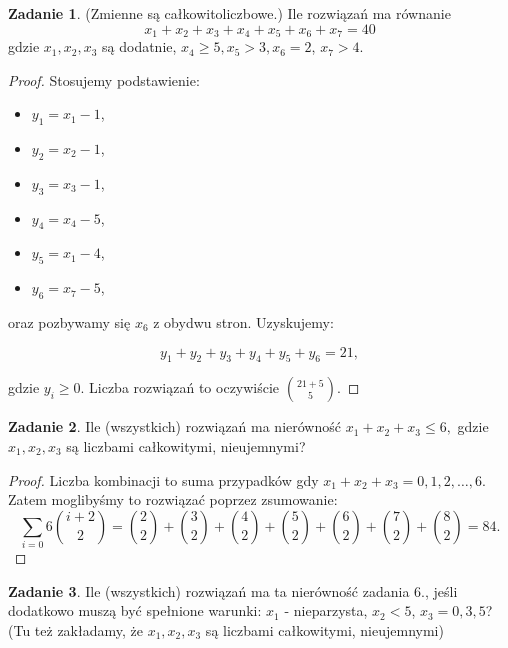 \documentclass[11pt]{article}
\theoremstyle{definition}
\newtheorem{zadanie}{Zadanie}
\numberwithin{zadanie}{subsection}
\begin{document}
\begin{zadanie}
    (Zmienne są całkowitoliczbowe.)
    Ile rozwiązań ma równanie
    $$x_1 + x_2 + x_3 + x_4 + x_5 + x_6 + x_7 = 40$$
    gdzie $x_1, x_2, x_3$ są dodatnie, $x_4 \geq 5, x_5 > 3, x_6 = 2$,
    $x_7 > 4$.
\end{zadanie}
\begin{proof}
    Stosujemy podstawienie:

    \begin{itemize}
        \item $y_1 = x_1-1$,
        \item $y_2 = x_2-1$,
        \item $y_3 = x_3-1$,
        \item $y_4 = x_4-5$,
        \item $y_5 = x_1-4$,
        \item $y_6 = x_7-5$,
    \end{itemize}
    oraz pozbywamy się $x_6$ z obydwu stron. Uzyskujemy:

    $$y_1+y_2+y_3+y_4+y_5+y_6=21,$$

    gdzie $y_i\geq0$. Liczba rozwiązań to oczywiście $\binom{21+5}{5}$.

\end{proof}

\begin{zadanie}
    Ile (wszystkich) rozwiązań ma nierówność
    $x_1 + x_2 + x_3 \leq 6,$
    gdzie $x_1, x_2, x_3$ są liczbami całkowitymi, nieujemnymi?
\end{zadanie}
\begin{proof}
    Liczba kombinacji to suma przypadków gdy $x_1+x_2+x_3=0,1,2,\dots,6$. Zatem moglibyśmy to rozwiązać poprzez zsumowanie:
    $$\sum_{i=0}6\binom{i+2}{2} = \binom22+\binom32+\binom42+\binom52+\binom62+\binom72+\binom82 = 84.$$
\end{proof}

\begin{zadanie}
    Ile (wszystkich) rozwiązań ma ta nierówność zadania 6., jeśli dodatkowo muszą być spełnione warunki:
    $x_1$ - nieparzysta, $x_2 < 5$,
    $x_3 = 0, 3, 5$? (Tu też zakładamy, że $x_1 , x_2 , x_3$ są liczbami całkowitymi, nieujemnymi)
\end{zadanie}

\end{document}
